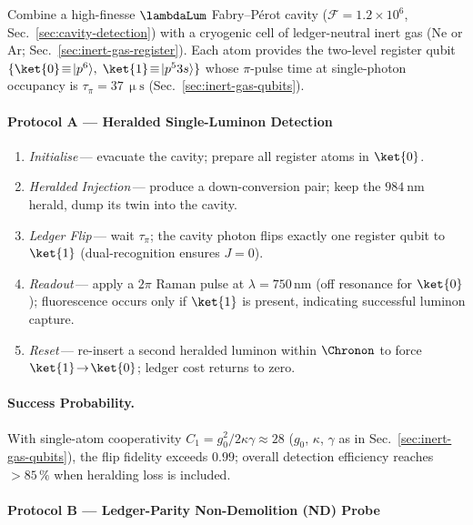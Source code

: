 \documentclass[11pt,oneside]{book}
\begin{document}
{Combine a high-finesse $\lambdaLum$ Fabry–Pérot cavity
($\mathcal{F}=1.2\times10^{6}$, Sec.~\ref{sec:cavity-detection})
with a cryogenic cell of ledger-neutral inert gas
(Ne or Ar; Sec.~\ref{sec:inert-gas-register}).  
Each atom provides the two-level register qubit
\(
   \{\ket{0}\!\equiv\!|p^{6}\rangle,\;
     \ket{1}\!\equiv\!|p^{5}3s\rangle\}
\)
whose $\pi$-pulse time at single-photon occupancy is
\(
   \tau_{\pi}=37\,\upmu\text{s}
   \)
(Sec.~\ref{sec:inert-gas-qubits}).

\paragraph{Protocol A — Heralded Single-Luminon Detection}

\begin{enumerate}[leftmargin=*,itemsep=3pt]
\item \emph{Initialise}\,—
      evacuate the cavity; prepare all register atoms in $\ket{0}$.
\item \emph{Heralded Injection}\,—
      produce a down-conversion pair; keep the
      \(\SI{984}{\nano\metre}\) herald, dump its twin into the cavity.
\item \emph{Ledger Flip}\,—
      wait $\tau_{\pi}$; the cavity photon flips exactly one register
      qubit to $\ket{1}$ (dual-recognition ensures $J\!=\!0$).
\item \emph{Readout}\,—
      apply a $2\pi$ Raman pulse at
      \(\lambda=750\,\text{nm}\)
      (off resonance for $\ket{0}$);
      fluorescence occurs only if $\ket{1}$ is present, indicating
      successful luminon capture.
\item \emph{Reset}\,—
      re-insert a second heralded luminon within
      \(\Chronon\)
      to force $\ket{1}\!\to\!\ket{0}$; ledger cost returns to zero.
\end{enumerate}

\paragraph{Success Probability.}
With single-atom cooperativity
\(C_{1}=g_{0}^{2}/2\kappa\gamma\approx28\)
($g_{0}$, $\kappa$, $\gamma$ as in Sec.~\ref{sec:inert-gas-qubits}),
the flip fidelity exceeds $0.99$; overall
detection efficiency reaches $>85\,\%$ when heralding loss is
included.

\paragraph{Protocol B — Ledger-Parity Non-Demolition (ND) Probe}

}
\end{document}
